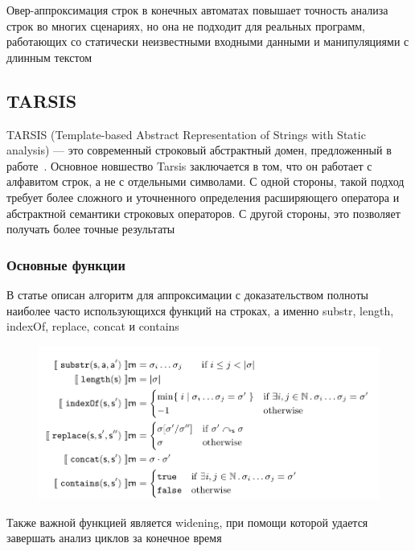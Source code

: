 Овер-аппроксимация строк в конечных автоматах повышает точность анализа строк во многих сценариях, но она не подходит для реальных программ, работающих со статически неизвестными входными данными и манипуляциями с длинным текстом




\newpage
\subsection{TARSIS}

TARSIS (Template-based Abstract Representation of Strings with Static analysis) — это современный строковый абстрактный домен, предложенный в работе~\cite{tarsis2021}. Основное новшество Tarsis заключается в том, что он работает с алфавитом строк, а не с отдельными символами. С одной стороны, такой подход требует более сложного и уточненного определения расширяющего оператора и абстрактной семантики строковых операторов. С другой стороны, это позволяет получать более точные результаты

\subsubsection*{Основные функции}
В статье описан алгоритм для аппроксимации с доказательством полноты наиболее часто использующихся функций на строках, а именно substr, length, indexOf, replace, concat и contains

\begin{figure}[H]
\includegraphics[width=\textwidth]{images/tarsis-functions.png}\hfill
\end{figure}

Также важной функцией является widening, при помощи которой удается завершать анализ циклов за конечное время